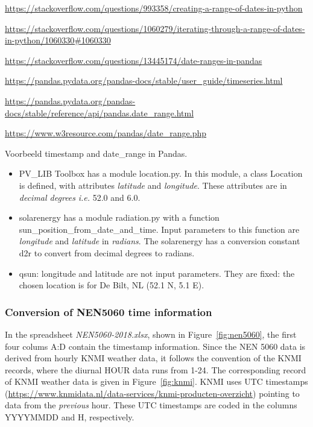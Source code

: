 \url{https://stackoverflow.com/questions/993358/creating-a-range-of-dates-in-python}

\url{https://stackoverflow.com/questions/1060279/iterating-through-a-range-of-dates-in-python/1060330#1060330}

\url{https://stackoverflow.com/questions/13445174/date-ranges-in-pandas}

\url{https://pandas.pydata.org/pandas-docs/stable/user_guide/timeseries.html}

\url{https://pandas.pydata.org/pandas-docs/stable/reference/api/pandas.date_range.html}

\url{https://www.w3resource.com/pandas/date_range.php}


Voorbeeld timestamp and date\_range in Pandas.

\begin{itemize}
	\item \textsf{PV\_LIB Toolbox} has a  module \textsf{location.py}. In this module, a class \textsf{Location} is defined, with attributes  \emph{latitude} and \emph{longitude}. These attributes are in \emph{decimal degrees} \textit{i.e.} 52.0 and 6.0. 
	\item \textsf{solarenergy} has a module \textsf{radiation.py} with  a function \textsf{sun\_position\_from\_date\_and\_time}. Input parameters to this function are \emph{longitude} and \emph{latitude} in \emph{radians}. The \textsf{solarenergy} has a conversion constant \textsf{d2r} to convert from decimal degrees to radians. 
	\item \textsf{qsun}: longitude and latitude are not input parameters. They are fixed: the chosen location is for De Bilt, NL (52.1 N, 5.1 E).
\end{itemize}

\subsubsection{Conversion of NEN5060 time information}

In the spreadsheet \emph{NEN5060-2018.xlsx}, shown in Figure~\ref{fig:nen5060}, the first four colums A:D contain the timestamp information. Since the NEN 5060 data is derived from hourly KNMI weather data, it follows the convention of the KNMI records, where the diurnal HOUR data runs from 1-24.  
The corresponding record of KNMI weather data is given in Figure~\ref{fig:knmi}. KNMI uses UTC timestamps (\url{https://www.knmidata.nl/data-services/knmi-producten-overzicht}) pointing to data from the \emph{previous} hour. These UTC timestamps are coded in the columns YYYYMMDD and H, respectively.

